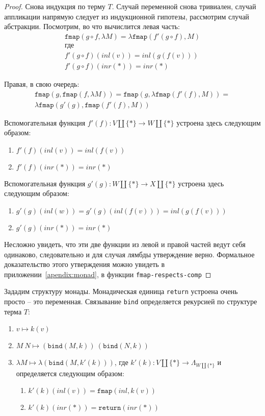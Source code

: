 \begin{proof}
  Снова индукция по терму $T$. Случай переменной снова тривиален, случай аппликации напрямую следует из индукционной гипотезы, рассмотрим случай абстракции. Посмотрим, во что вычислится левая часть:
  \begin{gather*}
    \texttt{fmap}(g \circ f, \lambda M) = \lambda \texttt{fmap}(f'(g \circ f), M) \\
    \text{где} \\
    f'(g \circ f)(inl(v)) = inl(g(f(v))) \\
    f'(g \circ f)(inr(*)) = inr(*)
  \end{gather*}

  Правая, в свою очередь:
  \begin{gather*}
    \texttt{fmap}(g, \texttt{fmap}(f, \lambda M)) = \texttt{fmap}(g, \lambda \texttt{fmap}(f'(f), M)) = \\
    \lambda \texttt{fmap}(g'(g), \texttt{fmap}(f'(f), M))
  \end{gather*}

  Вспомогательная функция $f'(f) : V \coprod \{*\} \to W \coprod \{*\}$ устроена здесь следующим образом:
  \begin{enumerate}
    \item $f'(f)(inl(v)) = inl(f(v))$
    \item $f'(f)(inr(*)) = inr(*)$
  \end{enumerate}

  Вспомогательная функция $g'(g) : W \coprod \{*\} \to X \coprod \{*\}$ устроена здесь следующим образом:
  \begin{enumerate}
    \item $g'(g)(inl(w)) = g'(g)(inl(f(v))) = inl(g(f(v)))$
    \item $g'(g)(inr(*)) = inr(*)$
  \end{enumerate}

  Несложно увидеть, что эти две функции из левой и правой частей ведут себя одинаково, следовательно и для случая лямбды утверждение верно.
  Формальное доказательство этого утверждения можно увидеть в приложении~\ref{apendix:monad}, в функции \texttt{fmap-respects-сomp}
\end{proof}


Зададим структуру монады. Монадическая единица \texttt{return} устроена очень просто -- это переменная. Связывание \texttt{bind} определяется рекурсией по структуре терма $T$:

\begin{enumerate}
  \item $v \mapsto k(v)$
  \item $M\ N \mapsto (\texttt{bind}(M, k))\ (\texttt{bind}(N, k))$
  \item $\lambda M \mapsto \lambda(\texttt{bind}(M, k'(k)))$, где $k'(k) : V \coprod \{*\} \to \Lambda_{W \coprod \{*\}}$ и определяется следующим образом:
    \begin{enumerate}
      \item $k'(k)(inl(v)) = \texttt{fmap}(inl, k(v))$
      \item $k'(k)(inr(*)) = \texttt{return}(inr(*))$
    \end{enumerate}
\end{enumerate}

